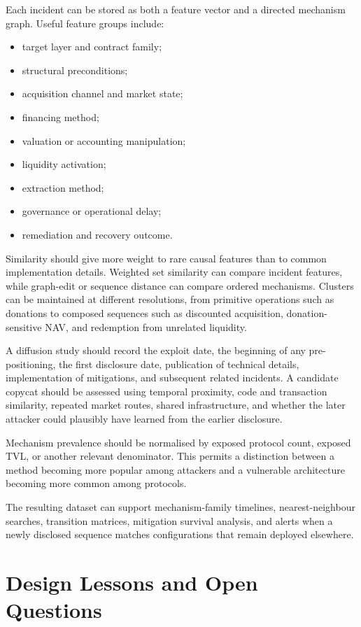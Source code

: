 \documentclass[11pt]{article}
\begin{document}
Each incident can be stored as both a feature vector and a directed mechanism graph.  Useful feature groups include:
\begin{itemize}[nosep]
    \item target layer and contract family;
    \item structural preconditions;
    \item acquisition channel and market state;
    \item financing method;
    \item valuation or accounting manipulation;
    \item liquidity activation;
    \item extraction method;
    \item governance or operational delay;
    \item remediation and recovery outcome.
\end{itemize}

Similarity should give more weight to rare causal features than to common implementation details.  Weighted set similarity can compare incident features, while graph-edit or sequence distance can compare ordered mechanisms.  Clusters can be maintained at different resolutions, from primitive operations such as donations to composed sequences such as discounted acquisition, donation-sensitive NAV, and redemption from unrelated liquidity.

A diffusion study should record the exploit date, the beginning of any pre-positioning, the first disclosure date, publication of technical details, implementation of mitigations, and subsequent related incidents.  A candidate copycat should be assessed using temporal proximity, code and transaction similarity, repeated market routes, shared infrastructure, and whether the later attacker could plausibly have learned from the earlier disclosure.

Mechanism prevalence should be normalised by exposed protocol count, exposed TVL, or another relevant denominator.  This permits a distinction between a method becoming more popular among attackers and a vulnerable architecture becoming more common among protocols.

The resulting dataset can support mechanism-family timelines, nearest-neighbour searches, transition matrices, mitigation survival analysis, and alerts when a newly disclosed sequence matches configurations that remain deployed elsewhere.

\section{Design Lessons and Open Questions}
\end{document}
